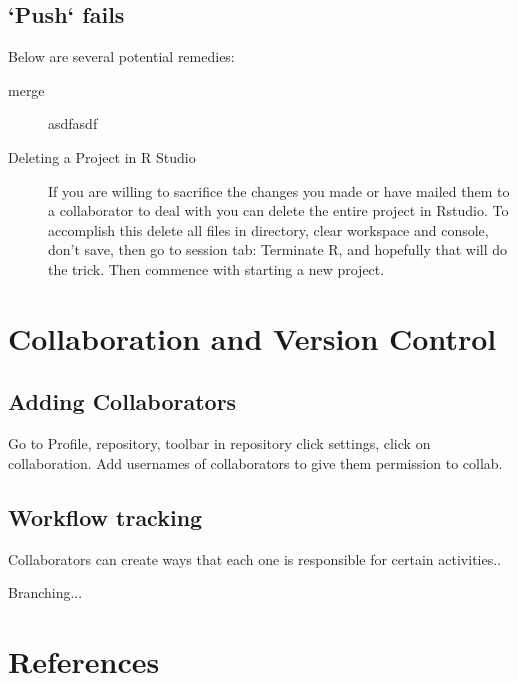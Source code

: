 \documentclass[12pt]{../SOP3_beta}
\begin{document}
\subsection{`Push` fails}

\NP Below are several potential remedies:

\begin{description}
  \item[merge] asdfasdf
  
  \item[Deleting a Project in R Studio]If you are willing to sacrifice the changes you made or have mailed them to a collaborator to deal with you can delete the entire project in Rstudio. To accomplish this delete all files in directory, clear workspace and console, don't save, then go to session tab: Terminate R, and hopefully that will do the trick. Then commence with starting a new project. 

\end{description}



\section{Collaboration and Version Control}

\subsection{Adding Collaborators}
\NP Go to Profile, repository, toolbar in repository click settings, click on collaboration. Add usernames of collaborators to give them permission to collab.

\subsection{Workflow tracking}

\NP Collaborators can create ways that each one is responsible for certain activities..

\NP Branching...
 

\section{References}

\NP 
\end{document}
